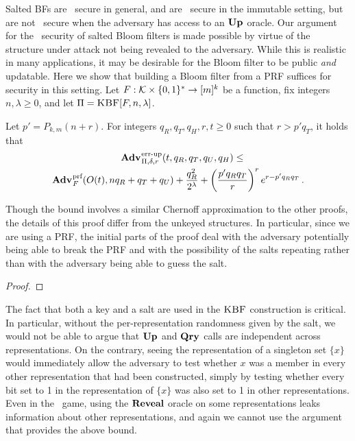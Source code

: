 Salted BFs are \erreps\ secure in general, and are \errep\ secure in the
immutable setting, but are not \errep\ secure when the adversary has access to
an $\textup{\textbf{Up}}\hspace{0.5pt}$ oracle. Our argument for the \erreps\ security of
salted Bloom filters is made possible by virtue of the structure under attack
not being revealed to the adversary. While this is realistic in many
applications, it may be desirable for the Bloom filter to be public \emph{and}
updatable.
%
Here we show that building a Bloom filter from a PRF suffices for security in
this setting.
%
Let $F:\mathcal{K}\times\{0,1\}^*\to[m]^k$ be a function, fix
integers~$n,\lambda\geq0$, and let $\Pi = \textnormal{\textsc{KBF}}[F,n,\lambda]$.

\begin{theorem}\label{thm:bf-key-bound}
  Let $p' = P_{k,m}(n+r)$.  For integers $q_R, q_T, q_H, r, t \geq 0$ such that
  $r > p'q_T$, it holds that
  \begin{equation*}
    \begin{aligned}
      \Adv{\errep}_{\Pi,\delta,r}(t,\,&q_R,q_T,q_U,q_H) \leq \\
        \Adv{\prf}_F(O(t),nq_R+q_T+q_U) & +
      \frac{q_R^2}{2^\lambda} +
      \left(\frac{p'q_Rq_T}{r}\right)^re^{r-p'q_Rq_T} \,.
    \end{aligned}
  \end{equation*}
\end{theorem}

Though the bound involves a similar Chernoff approximation to the other proofs,
the details of this proof differ from the unkeyed structures. In particular,
since we are using a PRF, the initial parts of the proof deal with the adversary
potentially being able to break the PRF and with the possibility of the salts
repeating rather than with the adversary being able to guess the salt.

\begin{proof}
  
\end{proof}

The fact that both a key and a salt are used in the $\textnormal{\textsc{KBF}}$ construction is
critical. In particular, without the per-representation randomness given by the
salt, we would not be able to argue that $\textup{\textbf{Up}}\hspace{0.5pt}$ and $\textup{\textbf{Qry}}\hspace{0.5pt}$ calls are
independent across representations. On the contrary, seeing the representation
of a singleton set $\{x\}$ would immediately allow the adversary to test whether
$x$ was a member in every other representation that had been constructed, simply
by testing whether every bit set to 1 in the representation of $\{x\}$ was also
set to 1 in other representations. Even in the \erreps\ game, using the $\mathbf{Reveal}$
oracle on some representations leaks information about other representations,
and again we cannot use the argument that provides the above bound.

